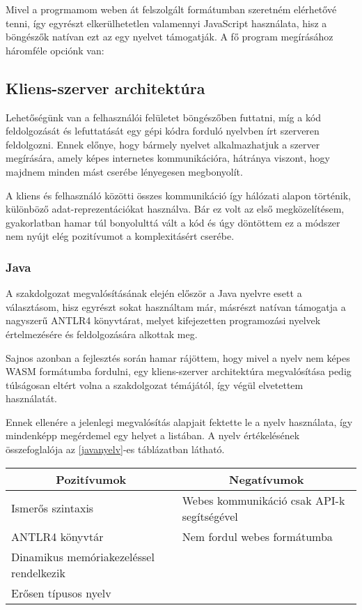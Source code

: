 Mivel a progrmamom weben át felszolgált formátumban szeretném elérhetővé tenni, így egyrészt elkerülhetetlen valamennyi JavaScript használata, hisz a böngészők natívan ezt az egy nyelvet támogatják. A fő program megírásához háromféle opciónk van:

\subsection{Kliens-szerver architektúra}

Lehetőségünk van a felhasználói felületet böngészőben futtatni, míg a kód feldolgozását és lefuttatását egy gépi kódra forduló nyelvben írt szerveren feldolgozni. Ennek előnye, hogy bármely nyelvet alkalmazhatjuk a szerver megírására, amely képes internetes kommunikációra, hátránya viszont, hogy majdnem minden mást cserébe lényegesen megbonyolít.

A kliens és felhasználó közötti összes kommunikáció így hálózati alapon történik, különböző adat-reprezentációkat használva. Bár ez volt az első megközelítésem, gyakorlatban hamar túl bonyolulttá vált a kód és úgy döntöttem ez a módszer nem nyújt elég pozitívumot a komplexitásért cserébe. 

\subsubsection{Java}

A szakdolgozat megvalósításának elején először a Java nyelvre esett a választásom, hisz egyrészt sokat használtam már, másrészt natívan támogatja a nagyszerű ANTLR4 könyvtárat, melyet kifejezetten programozási nyelvek értelmezésére és feldolgozására alkottak meg.

Sajnos azonban a fejlesztés során hamar rájöttem, hogy mivel a nyelv nem képes WASM formátumba fordulni, egy kliens-szerver architektúra megvalósítása pedig túlságosan eltért volna a szakdolgozat témájától, így végül elvetettem használatát.

Ennek ellenére a jelenlegi megvalósítás alapjait fektette le a nyelv használata, így mindenképp megérdemel egy helyet a listában. A nyelv értékelésének összefoglalója az \ref{javanyelv}-es táblázatban látható.

\begin{center}
  \begin{tabularx}{\textwidth}{X X}
    \hline
    \multicolumn{1}{c}{\bfseries{Pozitívumok}}         & \multicolumn{1}{c}{\bfseries{Negatívumok}} \\
    \hline
    Ismerős szintaxis & Webes kommunikáció csak API-k segítségével \\
    ANTLR4 könyvtár & Nem fordul webes formátumba \\
    Dinamikus memóriakezeléssel rendelkezik \\
    Erősen típusos nyelv \\
    \hline
  \end{tabularx}
\end{center}


